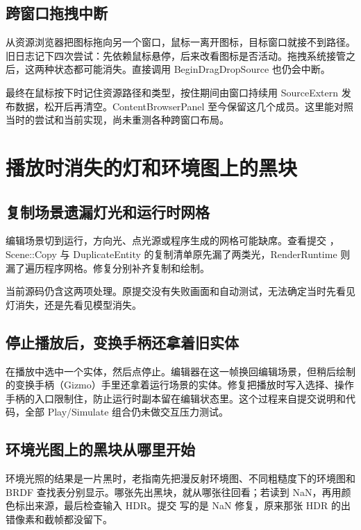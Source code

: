 \subsection{跨窗口拖拽中断}
从资源浏览器把图标拖向另一个窗口，鼠标一离开图标，目标窗口就接不到路径。旧日志记下四次尝试：先依赖鼠标悬停，后来改看图标是否活动。拖拽系统接管之后，这两种状态都可能消失。直接调用 BeginDragDropSource 也仍会中断。

最终在鼠标按下时记住资源路径和类型，按住期间由窗口持续用 SourceExtern 发布数据，松开后再清空。ContentBrowserPanel 至今保留这几个成员。这里能对照当时的尝试和当前实现，尚未重测各种跨窗口布局。

\newpage
\section{播放时消失的灯和环境图上的黑块}
\subsection{复制场景遗漏灯光和运行时网格}
编辑场景切到运行，方向光、点光源或程序生成的网格可能缺席。查看提交 ，Scene::Copy 与 DuplicateEntity 的复制清单原先漏了两类光，RenderRuntime 则漏了遍历程序网格。修复分别补齐复制和绘制。

当前源码仍含这两项处理。原提交没有失败画面和自动测试，无法确定当时先看见灯消失，还是先看见模型消失。

\subsection{停止播放后，变换手柄还拿着旧实体}
在播放中选中一个实体，然后点停止。编辑器在这一帧换回编辑场景，但稍后绘制的变换手柄（Gizmo）手里还拿着运行场景的实体。修复把播放时写入选择、操作手柄的入口限制住，防止运行时副本留在编辑状态里。这个过程来自提交说明和代码，全部 Play/Simulate 组合仍未做交互压力测试。

\subsection{环境光图上的黑块从哪里开始}
环境光照的结果是一片黑时，老指南先把漫反射环境图、不同粗糙度下的环境图和 BRDF 查找表分别显示。哪张先出黑块，就从哪张往回看；若读到 NaN，再用颜色标出来源，最后检查输入 HDR。提交  写的是 NaN 修复，原来那张 HDR 的出错像素和截帧都没留下。

